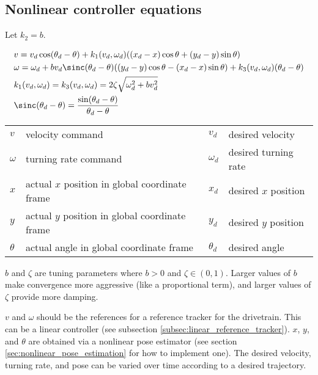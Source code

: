 \subsection{Nonlinear controller equations}

Let $k_2 = b$.

\begin{theorem}
  \begin{align}
    &v = v_d \cos(\theta_d - \theta) + k_1(v_d, \omega_d)((x_d - x)\cos\theta +
      (y_d - y)\sin\theta) \\
    &\omega = \omega_d +
      b v_d\sinc(\theta_d - \theta)((y_d - y)\cos\theta - (x_d - x)\sin\theta) +
      k_3 (v_d, \omega_d)(\theta_d - \theta) \\
    &k_1(v_d, \omega_d) = k_3(v_d, \omega_d) = 2\zeta\sqrt{\omega_d^2 + bv_d^2}
      \\
    &\sinc(\theta_d - \theta) =
      \frac{\sin(\theta_d - \theta)}{\theta_d - \theta}
  \end{align}

  \begin{figurekey}
    \begin{tabular}{llll}
      $v$ & velocity command & $v_d$ & desired velocity \\
      $\omega$ & turning rate command & $\omega_d$ & desired turning rate \\
      $x$ & actual $x$ position in global coordinate frame & $x_d$ &
        desired $x$ position \\
      $y$ & actual $y$ position in global coordinate frame & $y_d$ &
        desired $y$ position \\
      $\theta$ & actual angle in global coordinate frame & $\theta_d$ &
        desired angle
    \end{tabular}
  \end{figurekey}

  $b$ and $\zeta$ are tuning parameters where $b > 0$ and $\zeta \in (0, 1)$.
  Larger values of $b$ make convergence more aggressive (like a proportional
  term), and larger values of $\zeta$ provide more damping.
\end{theorem}

$v$ and $\omega$ should be the \glspl{reference} for a \gls{reference} tracker
for the drivetrain. This can be a linear controller (see subsection
\ref{subsec:linear_reference_tracker}). $x$, $y$, and $\theta$ are obtained via
a nonlinear \gls{pose} estimator (see section
\ref{sec:nonlinear_pose_estimation} for how to implement one). The desired
velocity, turning rate, and \gls{pose} can be varied over time according to a
desired trajectory.

